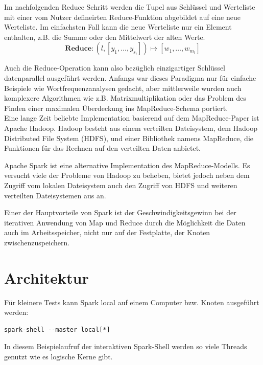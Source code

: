 Im nachfolgenden Reduce Schritt werden die Tupel aus Schlüssel und Werteliste mit einer vom Nutzer defineirten Reduce-Funktion abgebildet auf eine neue Werteliste.
Im einfachsten Fall kann die neue Werteliste nur ein Element enthalten, z.B. die Summe oder den Mittelwert der alten Werte.
\begin{equation}
    \mathbf{Reduce : }
    \left( l, \left[ y_1, \ldots, y_{s_l} \right] \right)
    \mapsto \left[ w_1, \ldots, w_{m_l} \right]
\end{equation}

Auch die Reduce-Operation kann also bezüglich einzigartiger Schlüssel datenparallel ausgeführt werden.
Anfangs war dieses Paradigma nur für einfache Beispiele wie Wortfrequenzanalysen gedacht, aber mittlerweile wurden auch komplexere Algorithmen wie z.B. Matrixmultiplikation\cite{matmulmapreduce} oder das Problem des Finden einer maximalen Überdeckung\cite{maxcovermapreduce} ins MapReduce-Schema portiert.\\


Eine lange Zeit beliebte Implementation basierend auf dem MapReduce-Paper\cite{mapreduce2004} ist Apache Hadoop\cite{hadoop}.
Hadoop besteht aus einem verteilten Dateisystem, dem Hadoop Distributed File System (HDFS), und einer Bibliothek namens MapReduce, die Funktionen für das Rechnen auf den verteilten Daten anbietet.

Apache Spark\cite{spark} ist eine alternative Implementation des MapReduce-Modells.
Es versucht viele der Probleme von Hadoop zu beheben, bietet jedoch neben dem Zugriff vom lokalen Dateisystem auch den Zugriff von HDFS und weiteren verteilten Dateisystemen aus an.

Einer der Hauptvorteile von Spark ist der Geschwindigkeitsgewinn bei der iterativen Anwendung von Map und Reduce durch die Möglichkeit die Daten auch im Arbeitsspeicher, nicht nur auf der Festplatte, der Knoten zwischenzuspeichern.


\section{Architektur}

Für kleinere Tests kann Spark local auf einem Computer bzw. Knoten ausgeführt werden:
\begin{lstlisting}[numbers=none]
spark-shell --master local[*]
\end{lstlisting}\vspace{-1.5\baselineskip}
In diesem Beispielaufruf der interaktiven Spark-Shell werden so viele Threads genutzt wie es logische Kerne gibt.

